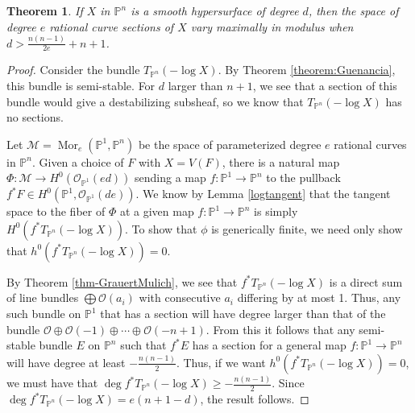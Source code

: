 \documentclass[11pt,reqno]{amsart}
\theoremstyle{plain}
\newtheorem{theorem}{Theorem}[section]
\theoremstyle{definition}
\theoremstyle{remark}
\numberwithin{equation}{section}
\renewcommand{\to}{{\longrightarrow}}
\numberwithin{equation}{section}
\newcommand{\OO}{\mathscr{O}}
\newcommand{\PP}{\mathbb{P}}
\newcommand{\cM}{\mathcal{M}}
\begin{document}
\begin{theorem}
\label{theorem:degEcurvesLargen}
If $X$ in $\mathbb{P}^n$ is a smooth hypersurface of degree $d$, then the space of degree $e$ rational curve sections of $X$ vary maximally in modulus when $d > \frac{n(n-1)}{2e} + n + 1$.
\end{theorem}
\begin{proof}
Consider the bundle $T_{\PP^n}(-\log X)$. By Theorem \ref{theorem:Guenancia}, this bundle is semi-stable. For $d$ larger than $n+1$, we see that a section of this bundle would give a destabilizing subsheaf, so we know that $T_{\PP^n}(-\log X)$ has no sections.

Let $\cM=\operatorname{Mor}_e(\PP^1,\PP^n)$ be the space of parameterized degree $e$ rational curves in $\PP^n$. Given a choice of $F$ with $X=V(F)$, there is a natural map $\Phi: \cM \to H^0(\OO_{\PP^1}(ed))$ sending a map $f:\PP^1\to \PP^n$ to the pullback $f^{*}F\in H^0(\PP^1,\OO_{\PP^1}(de))$. We know by Lemma \ref{logtangent} that the tangent space to the fiber of $\Phi$ at a given map $f:\PP^1\to \PP^n$ is simply $H^0(f^{*}T_{\PP^n}(-\log X))$. To show that $\phi$ is generically finite, we need only show that $h^0(f^{*}T_{\PP^n}(-\log X)) = 0$.

By Theorem \ref{thm-GrauertMulich}, we see that $f^{*}T_{\PP^n}(-\log X)$ is a direct sum of line bundles $\bigoplus \OO(a_i)$ with consecutive $a_i$ differing by at most 1. Thus, any such bundle on $\PP^1$ that has a section will have degree larger than that of the bundle $\OO \oplus \OO(-1) \oplus \cdots \oplus \OO(-n+1)$. From this it follows that any semi-stable bundle $E$ on $\PP^n$ such that $f^{*}E$ has a section for a general map $f:\PP^1\to \PP^n$ will have degree at least $-\frac{n(n-1)}{2}$. Thus, if we want $h^0(f^{*}T_{\PP^n}(-\log X)) = 0$, we must have that $\deg f^{*} T_{\PP^n}(-\log X) \geq - \frac{n(n-1)}{2}$. Since $\deg f^{*}T_{\PP^n}(-\log X) = e(n+1-d)$, the result follows.
\end{proof}
\end{document}

